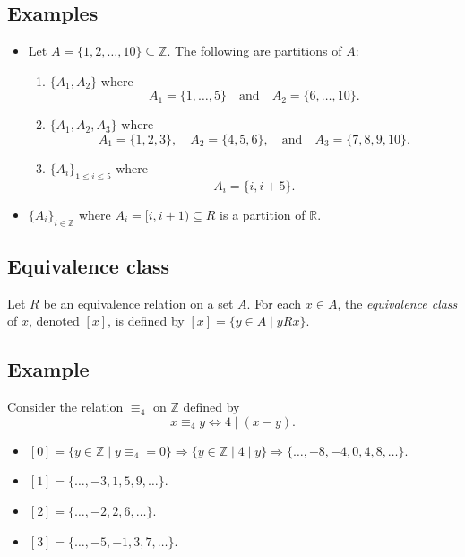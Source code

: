 \documentclass[11pt]{article}
\begin{document}
    \subsection{Examples}
    \begin{itemize}
        \item Let \(A = \{1,2, \dots, 10\} \subseteq \mathbb{Z}\). The following are partitions of $A$:
        \begin{enumerate}
            \item \(\{A_1, A_2\}\) where \[A_1 = \{1, \dots, 5\} \quad \text{and} \quad A_2 = \{6, \dots, 10\}.\]
            \item \(\{A_1, A_2, A_3\}\) where \[A_1 = \{1,2,3\}, \quad A_2 = \{4,5,6\}, \quad \text{and} \quad A_3 = \{7,8,9,10\}.\] 
            \item \(\{A_i\}_{1 \leq i \leq 5}\) where \[A_i = \{i, i+5\}.\]
        \end{enumerate}
        \item \(\{A_i\}_{i \in \mathbb{Z}}\) where \(A_i = [i, i+1) \subseteq R\) is a partition of \(\mathbb{R}\). 
    \end{itemize}

    \subsection{Equivalence class}

    Let $R$ be an equivalence relation on a set $A$. For each \(x \in A\), the \emph{equivalence class} of $x$, denoted \([x]\), is defined by \([x] = \{y \in A \mid y R x\}\). 
    
    \subsection{Example}

    Consider the relation \(\equiv_4\) on \(\mathbb{Z}\) defined by \[x \equiv_4 y \Leftrightarrow 4 \mid (x-y).\]
    \begin{itemize}
        \item \([0] = \{y \in \mathbb{Z} \mid y \equiv_4 = 0\} \Rightarrow \{y \in \mathbb{Z} \mid 4 \mid y\} \Rightarrow \{\dots, -8, -4, 0, 4 ,8, \dots\}\).
        \item \([1] = \{\dots, -3,1,5,9,\dots\}\).
        \item \([2] = \{\dots, -2, 2, 6,\dots\}\).
        \item \([3] = \{\dots, -5, -1, 3,7,\dots\}\).
    \end{itemize}
\end{document}
